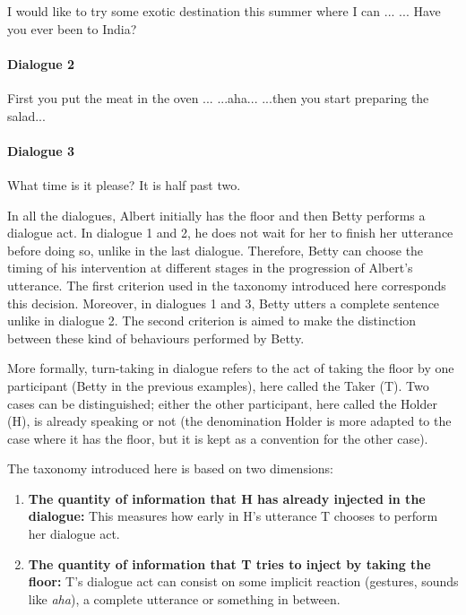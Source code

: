        \begin{dialogue}
           I would like to try some exotic destination this summer where I can ...
           ... Have you ever been to India?
        \end{dialogue}

        \paragraph{Dialogue 2}

        \begin{dialogue}
           First you put the meat in the oven ...
           ...aha...
           ...then you start preparing the salad...
        \end{dialogue}

        \paragraph{Dialogue 3}

        \begin{dialogue}
           What time is it please?
           It is half past two.
        \end{dialogue}

        In all the dialogues, Albert initially has the floor and then Betty performs a dialogue act. In dialogue 1 and 2, he does not wait for her to finish her utterance before doing so, unlike in the last dialogue. Therefore, Betty can choose the timing of his intervention at different stages in the progression of Albert's utterance. The first criterion used in the taxonomy introduced here corresponds this decision. Moreover, in dialogues 1 and 3, Betty utters a complete sentence unlike in dialogue 2. The second criterion is aimed to make the distinction between these kind of behaviours performed by Betty.

	More formally, turn-taking in dialogue refers to the act of taking the floor by one participant (Betty in the previous examples), here called the Taker (T). Two cases can be distinguished; either the other participant, here called the Holder (H), is already speaking or not (the denomination Holder is more adapted to the case where it has the floor, but it is kept as a convention for the other case).
    
    The taxonomy introduced here is based on two dimensions:

    \begin{enumerate}
      \item \textbf{The quantity of information that H has already injected in the dialogue:} This measures how early in H's utterance T chooses to perform her dialogue act.
      \item \textbf{The quantity of information that T tries to inject by taking the floor:} T's dialogue act can consist on some implicit reaction (gestures, sounds like \textit{aha}), a complete utterance or something in between.
    \end{enumerate}

